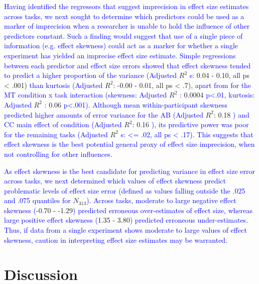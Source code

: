 \documentclass[
  man]{apa6}
\begin{document}
\textcolor{blue}{Having identified the regressors that suggest imprecision in effect size estimates across tasks, we next sought to determine which predictors could be used as a marker of imprecision when a researcher is unable to hold the influence of other predictors constant. Such a finding would suggest that use of a single piece of information (e.g. effect skewness) could act as a marker for whether a single experiment has yielded an imprecise effect size estimate. Simple regressions between each predictor and effect size errors showed that effect skewness tended to predict a higher proportion of the variance (Adjusted} \(R^2\) \textcolor{blue}{s:} 0.04 - 0.10, all ps \textless{} .001) \textcolor{blue}{than kurtosis (Adjusted} \(R^2\): -0.00 - 0.01, all ps \textless{} .7), \textcolor{blue}{apart from for the MT condition x task interaction (skewness: Adjusted} \(R^2\) \textcolor{blue}{:} 0.0004 \textcolor{blue}{p<.01, kurtosis: Adjusted} \(R^2\) \textcolor{blue}{:} 0.06 \textcolor{blue}{p<.001). Although mean within-participant skewness predicted higher amounts of error variance for the AB (Adjusted} \(R^2\): 0.18 \textcolor{blue}{) and CC main effect of condition (Adjusted} \(R^2\): 0.16 \textcolor{blue}{), its predictive power was poor for the remaining tasks (Adjusted} \(R^2\) \textcolor{blue}{s: <= .02, all ps < .17). This suggests that effect skewness is the best potential general proxy of effect size imprecision, when not controlling for other influences.}

\textcolor{blue}{As effect skewness is the best candidate for predicting variance in effect size error across tasks, we next determined which values of effect skewness predict problematic levels of effect size error (defined as values falling outside the .025 and .075 quantiles for} \(N_{313}\)\textcolor{blue}{). Across tasks, moderate to large negative effect skewness (}-0.70 - -1.29\textcolor{blue}{) predicted erroneous over-estimates of effect size, whereas large positive effect skewness (}1.35 - 3.80\textcolor{blue}{) predicted erroneous under-estimates. Thus, if data from a single experiment shows moderate to large values of effect skewness, caution in interpreting effect size estimates may be warranted.}

\hypertarget{discussion}{%
\section{Discussion}\label{discussion}}

\label{sec:Discussion}
\end{document}

